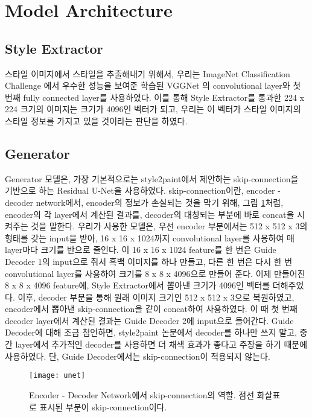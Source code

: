 \section{Model Architecture}
\label{sec:archi}

\subsection{Style Extractor}

스타일 이미지에서 스타일을 추출해내기 위해서, 우리는 ImageNet Classification Challenge \cite{Deng2009ImageNet}에서 우수한 성능을 보여준 학습된 VGGNet \cite{Simonyan2014}의 convolutional layer와 첫 번째 fully connected layer를 사용하였다.
이를 통해 Style Extractor를 통과한 224 x 224 크기의 이미지는 크기가 4096인 벡터가 되고, 우리는 이 벡터가 스타일 이미지의 스타일 정보를 가지고 있을 것이라는 판단을 하였다.
\subsection{Generator}

Generator 모델은, 가장 기본적으로는 style2paint에서 제안하는 skip-connection을 기반으로 하는 Residual U-Net을 사용하였다.
skip-connection이란, encoder - decoder network에서, encoder의 정보가 손실되는 것을 막기 위해, 그림 \ref{fig:unet}처럼, encoder의 각 layer에서 계산된 결과를, decoder의 대칭되는 부분에 바로 concat을 시켜주는 것을 말한다.
우리가 사용한 모델은, 우선 encoder 부분에서는 512 x 512 x 3의 형태를 갖는 input을 받아, 16 x 16 x 1024까지 convolutional layer를 사용하여 매 layer마다 크기를 반으로 줄인다.
이 16 x 16 x 1024 feature를 한 번은 Guide Decoder 1의 input으로 줘서 흑백 이미지를 하나 만들고, 다른 한 번은 다시 한 번 convolutional layer를 사용하여 크기를 8 x 8 x 4096으로 만들어 준다.
이제 만들어진 8 x 8 x 4096 feature에, Style Extractor에서 뽑아낸 크기가 4096인 벡터를 더해주었다.
이후, decoder 부분을 통해 원래 이미지 크기인 512 x 512 x 3으로 복원하였고, encoder에서 뽑아낸 skip-connection을 같이 concat하여 사용하였다.
이 때 첫 번째 decoder layer에서 계산된 결과는 Guide Decoder 2에 input으로 들어간다. Guide Decoder에 대해 조금 첨언하면, style2paint 논문에서 decoder를 하나만 쓰지 말고, 중간 layer에서 추가적인 decoder를 사용하면 더 채색 효과가 좋다고 주장을 하기 때문에 사용하였다.
단, Guide Decoder에서는 skip-connection이 적용되지 않는다.

\begin{figure}[t]
	\centering
	\texttt{[image: unet]}
	\caption{Encoder - Decoder Network에서 skip-connection의 역할. 점선 화살표로 표시된 부분이 skip-connection이다.}
	\label{fig:unet}
\end{figure}


